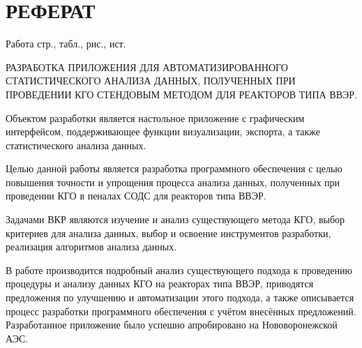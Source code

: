 \documentclass[a4paper,12pt]{article}
\begin{document}
\section*{\centering РЕФЕРАТ}

\thispagestyle{empty} %


Работа  стр.,  табл.,  рис., \totalmycitecounts ист. 

РАЗРАБОТКА ПРИЛОЖЕНИЯ ДЛЯ АВТОМАТИЗИРОВАННОГО СТАТИСТИЧЕСКОГО АНАЛИЗА ДАННЫХ, ПОЛУЧЕННЫХ ПРИ ПРОВЕДЕНИИ КГО СТЕНДОВЫМ МЕТОДОМ ДЛЯ РЕАКТОРОВ ТИПА ВВЭР.

Объектом разработки является настольное приложение с графическим интерфейсом, поддерживающее функции визуализации, экспорта, а также статистического анализа данных.

Целью данной работы является разработка программного обеспечения с целью повышения точности и упрощения процесса анализа данных, полученных при проведении КГО в пеналах СОДС для реакторов типа ВВЭР. 

Задачами ВКР являются изучение и анализ существующего метода КГО, выбор критериев для анализа данных, выбор и освоение инструментов разработки, реализация алгоритмов анализа данных.

В работе производится подробный анализ существующего подхода к проведению процедуры и анализу данных КГО на реакторах типа ВВЭР, приводятся предложения по улучшению и автоматизации этого подхода, а также описывается процесс разработки программного обеспечения с учётом внесённых предложений. Разработанное приложение было успешно апробировано на Нововоронежской АЭС.
\end{document}
